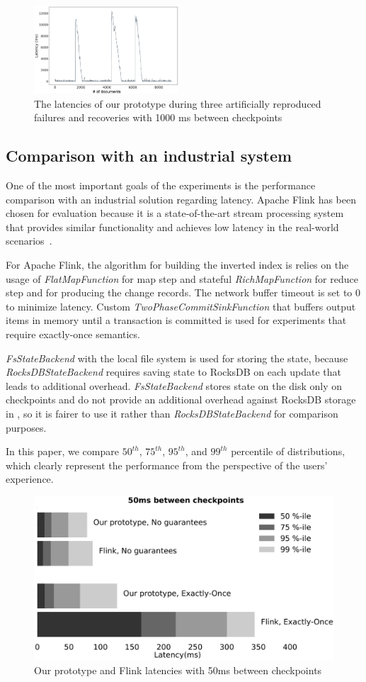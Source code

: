 \begin{figure}[htbp]
  \centering
  \includegraphics[width=0.48\textwidth]{pics/blink-2}
  \caption{The latencies of our prototype during three artificially reproduced failures and recoveries with 1000 ms between checkpoints}
  \label {recovery}
\end{figure}

\subsection{Comparison with an industrial system}
One of the most important goals of the experiments is the performance comparison with an industrial solution regarding latency. Apache Flink has been chosen for evaluation because it is a state-of-the-art stream processing system that provides similar functionality and achieves low latency in the real-world scenarios~\cite{S7530084}. 

For Apache Flink, the algorithm for building the inverted index is relies on the usage of {\it FlatMapFunction} for map step and stateful {\it RichMapFunction} for reduce step and for producing the change records. The network buffer timeout is set to 0 to minimize latency. Custom {\it TwoPhaseCommitSinkFunction} that buffers output items in memory until a transaction is committed is used for experiments that require exactly-once semantics. 

{\it FsStateBackend} with the local file system is used for storing the state, because {\it RocksDBStateBackend} requires saving state to RocksDB on each update that leads to additional overhead. {\it FsStateBackend} stores state on the disk only on checkpoints and do not provide an additional overhead against RocksDB storage in \FlameStream, so it is fairer to use it rather than {\it RocksDBStateBackend} for comparison purposes.

In this paper, we compare $50^{th}$, $75^{th}$, $95^{th}$, and $99^{th}$ percentile of distributions, which clearly represent the performance from the perspective of the users' experience.

\begin{figure}[htbp]
  \centering
  \includegraphics[width=.48\textwidth]{pics/comparison50}
  \caption{Our prototype and Flink latencies with 50ms between checkpoints}
  \label{comparison50}
\end{figure}

